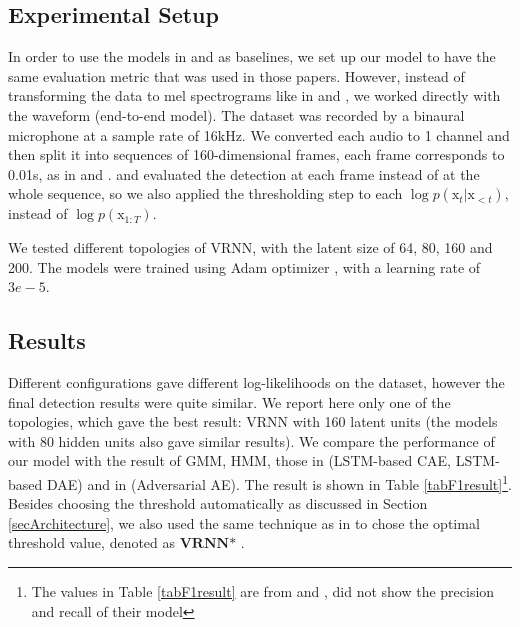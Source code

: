 \documentclass{article}
\begin{document}
\subsection{Experimental Setup}
\label{secExperimentalSetup}

In order to use the models in \cite{marchi_novel_2015} and \cite{principi_acoustic_2017} as baselines, we set up our model to have the same evaluation metric that was used in those papers. However, instead of transforming the data to mel spectrograms like in \cite{marchi_novel_2015} and \cite{principi_acoustic_2017}, we worked directly with the waveform (end-to-end model). The dataset was recorded by a binaural microphone at a sample rate of 16kHz. We converted each audio to 1 channel and then split it into sequences of 160-dimensional frames, each frame corresponds to 0.01s, as in \cite{marchi_novel_2015} and \cite{principi_acoustic_2017}. \cite{marchi_novel_2015} and \cite{principi_acoustic_2017} evaluated the detection at each frame instead of at the whole sequence, so we also applied the thresholding step to each $\log p(\boldsymbol{\mathrm{x}}_t|\boldsymbol{\mathrm{x}}_{<t})$, instead of $\log p(\boldsymbol{\mathrm{x}}_{1:T})$. 

We tested different topologies of VRNN, with the latent size of 64, 80, 160 and 200.
The models were trained using Adam optimizer \cite{kingma_adam:_2015}, with a learning rate of $3e-5$. 


\subsection{Results}
\label{secResult}

Different configurations gave different log-likelihoods on the dataset, however the final detection results were quite similar. We report here only one of the topologies, which gave the best result: VRNN with 160 latent units (the models with 80 hidden units also gave similar results).
We compare the performance of our model with the result of GMM, HMM, those in \cite{marchi_novel_2015} (LSTM-based CAE, LSTM-based DAE) and in \cite{principi_acoustic_2017} (Adversarial AE). The result is shown in  Table \ref{tabF1result}\footnote{The values in Table \ref{tabF1result} are from \cite{marchi_novel_2015} and \cite{principi_acoustic_2017}, \cite{principi_acoustic_2017} did not show the precision and recall of their model}. Besides choosing the threshold automatically as discussed in Section \ref{secArchitecture}, we also used the same technique as in \cite{marchi_novel_2015} to chose the optimal threshold value, denoted as $\textbf{VRNN* }$.
\end{document}
